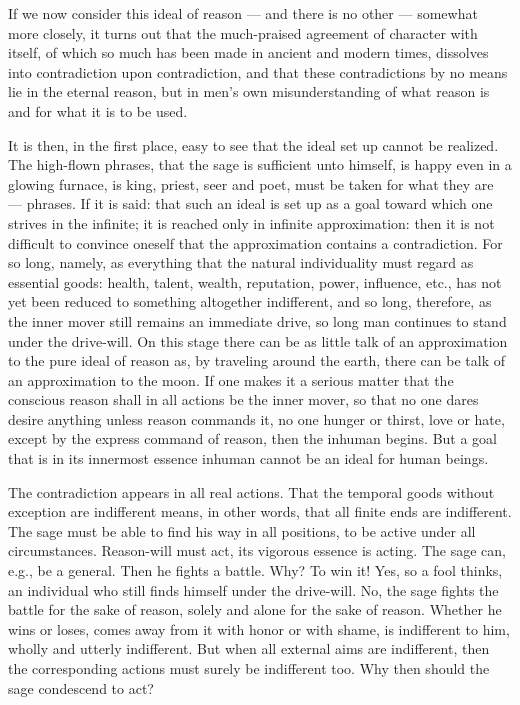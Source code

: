\documentclass[12pt,a4paper,openany]{book}
\newcommand{\opage}[1]{\marginnote{\footnotesize\textit{[#1]}}}
\begin{document}
If we now consider this ideal of reason --- and there is no other --- somewhat more closely, it turns out that the
much-praised agreement of character with itself, of which so much has been made in ancient and modern times, dissolves into
contradiction upon contradiction, and that these contradictions by no means lie in the eternal reason, but in men's own
misunderstanding of what reason is and for what it is to be used.

It is then, in the first place, easy to see that the ideal set up cannot be realized. The high-flown phrases, that the sage
is sufficient unto himself, is happy even in a glowing furnace, is king, priest, seer and poet, must be taken for what they
are --- phrases.
If it is said:
that such an ideal is set up as a goal toward which one strives in the infinite; it is reached only in infinite approximation:
then it is not difficult to convince oneself that the approximation contains a contradiction. For so long, namely, as
everything that the natural individuality must regard as essential goods: health, talent, wealth, reputation,
power, influence, etc., has not yet been reduced to something altogether indifferent, and so long, therefore, as the inner
mover still remains an immediate drive,
so long man continues to stand under the drive-will.
On this stage there can be as little talk of an approximation to the pure ideal of reason as, by traveling around the earth,
there can be talk of an approximation to the moon.
If one makes it a serious matter that the conscious reason shall in all actions be the inner mover, so that no one dares
desire anything unless reason commands it, no one hunger or thirst, love or hate, except by the express command of reason,
then the inhuman begins.
\setcounter{footnote}{0}%
\opage{30}But a goal that is in its innermost essence inhuman cannot be an ideal for human beings.

The contradiction appears in all real actions. That the temporal goods without exception are indifferent means, in other
words, that all finite ends are indifferent. The sage must be able to find his way in all positions, to be active under all
circumstances. Reason-will must act, its vigorous essence is acting. The sage can, e.g., be a general. Then he fights a
battle. Why? To win it! Yes, so a fool thinks, an individual who still finds himself under the drive-will. No, the sage
fights the battle for the sake of reason, solely and alone for the sake of reason. Whether he wins or loses, comes away from
it with honor or with shame, is indifferent to him, wholly and utterly indifferent. But when all external aims are
indifferent, then the corresponding actions must surely be indifferent too. Why then should the sage condescend to act?
\end{document}
